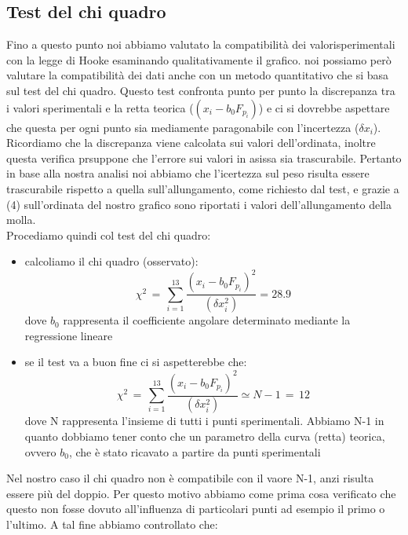 \subsection{Test del chi quadro}
Fino a questo punto noi abbiamo valutato la compatibilità dei valorisperimentali con la legge di Hooke esaminando qualitativamente il grafico. noi possiamo però valutare la compatibilità dei dati anche con un metodo quantitativo che si basa sul test del chi quadro. Questo test confronta punto per punto la discrepanza tra i valori sperimentali e la retta teorica ($(x_i - b_0 F_{p_i})$) e ci si dovrebbe aspettare che questa per ogni punto sia mediamente paragonabile con l'incertezza ($\delta x_i$). Ricordiamo che la discrepanza viene calcolata sui valori dell'ordinata, inoltre questa verifica prsuppone che l'errore sui valori in asissa sia trascurabile.
Pertanto in base alla nostra analisi noi abbiamo che l'icertezza sul peso risulta essere trascurabile rispetto  a quella sull'allungamento, come richiesto dal test, e grazie a (4) sull'ordinata del nostro grafico sono riportati i valori dell'allungamento della molla.\\
Procediamo quindi col test del chi quadro:
\begin{itemize}
\item{calcoliamo il chi quadro (osservato):
	\begin{equation*}
		\chi^2 \,=\, \sum_{i=1}^{13} \frac{(x_i - b_0 F_{p_i})^2}{(\delta x_i^2)} = 28.9
	\end{equation*}
	dove $b_0$ rappresenta il coefficiente angolare determinato mediante la regressione lineare}
\item{se il test va a buon fine ci si aspetterebbe che:
	\begin{equation*}
		\chi^2 \,=\, \sum_{i=1}^{13} \frac{(x_i - b_0 F_{p_i})^2}{(\delta x_i^2)} \simeq N - 1 \,=\, 12
	\end{equation*}
	dove N rappresenta l'insieme di tutti i punti sperimentali. Abbiamo N-1 in quanto dobbiamo tener conto che un parametro della curva (retta) teorica, ovvero $b_0$, che è stato ricavato a partire da punti sperimentali}
\end{itemize}
Nel nostro caso il chi quadro non è compatibile con il vaore N-1, anzi risulta essere più del doppio.
Per questo motivo abbiamo come prima cosa verificato che questo non fosse dovuto all'influenza di particolari punti ad esempio il primo o l'ultimo. A tal fine abbiamo controllato che:

